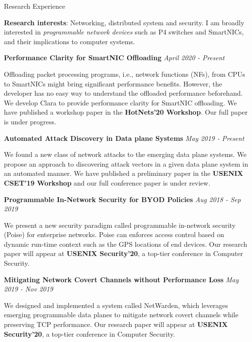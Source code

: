 \documentclass{resume} %
\begin{document}
\begin{rSection}{Research Experience}

{\bf Research interests}: Networking, distributed system and security.
I am broadly interested in \textit{programmable network devices} such as
P4 switches and SmartNICs, and their implications to computer systems.

\item {\bf Performance Clarity for SmartNIC Offloading} \hfill {\em April 2020 - Present}

Offloading packet processing programs, i.e., network functions (NFs),
from CPUs to SmartNICs might bring significant performance benefits.
However, the developer has no easy way to understand the offloaded performance beforehand.
We develop Clara to provide performance clarity for SmartNIC offloading.
We have published a workshop paper in the {\bf HotNets'20 Workshop}.
Our full paper is under progress.

\item {\bf Automated Attack Discovery in Data plane Systems}    \hfill {\em May 2019 - Present}

We found a new class of network attacks to the emerging data plane systems.
We propose an approach to discovering attack vectors in a given data plane system in an automated manner.
We have published a preliminary paper in the {\bf USENIX CSET'19 Workshop}
and our full conference paper is under review.

\item {\bf Programmable In-Network Security for BYOD Policies} \hfill {\em Aug 2018 - Sep 2019}

We present a new security paradigm called programmable in-network security (Poise) for enterprise networks.
Poise can enforces access control based on dynamic run-time context
such as the GPS locations of end devices.
Our research paper will appear at {\bf USENIX Security'20}, a top-tier conference in Computer Security.

\item {\bf Mitigating Network Covert Channels without Performance Loss} \hfill {\em May 2019 - Nov 2019}

We designed and implemented a system called NetWarden,
which leverages emerging programmable data planes to mitigate network covert channels
while preserving TCP performance.
Our research paper will appear at {\bf USENIX Security'20}, a top-tier conference in Computer Security.

\end{rSection}
\end{document}
